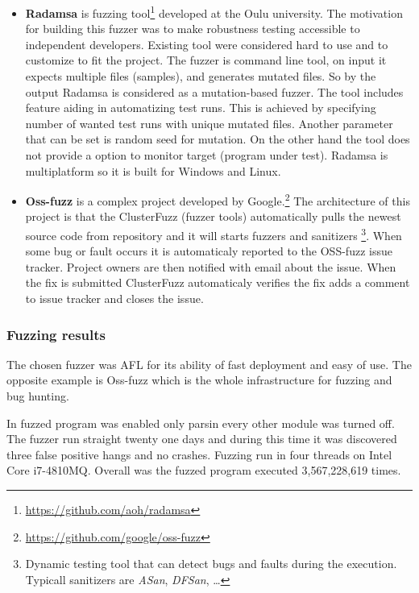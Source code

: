 \begin{itemize}
	\item \textbf{Radamsa} is fuzzing tool\footnote{\url{https://github.com/aoh/radamsa}} developed at the Oulu university.
	The motivation for building this fuzzer was to make robustness testing accessible to independent developers.
	Existing tool were considered hard to use and to customize to fit the project.
	The fuzzer is command line tool, on input it expects multiple files (samples), and generates mutated files.
	So by the output Radamsa is considered as a mutation-based fuzzer.
	The tool includes feature aiding in automatizing test runs.
	This is achieved by specifying number of wanted test runs with unique mutated files.
	Another parameter that can be set is random seed for mutation.
	On the other hand the tool does not provide a option to monitor target (program under test).
	Radamsa is multiplatform so it is built for Windows and Linux.\cite{radamsaThesis}

	\item \textbf{Oss-fuzz} is a complex project developed by Google.\footnote{\url{https://github.com/google/oss-fuzz}}
	The architecture of this project is that the ClusterFuzz (fuzzer tools)
	automatically pulls the newest source code from repository and it will starts
	fuzzers and sanitizers \footnote{Dynamic testing tool that can detect bugs and
	faults during the execution. Typicall sanitizers are \textit{ASan},
	\textit{DFSan}, \ldots}. When some bug or fault occurs it is automaticaly
	reported to the OSS-fuzz issue tracker. Project owners are then notified with
	email about the issue. When the fix is submitted ClusterFuzz automaticaly
	verifies the fix adds a comment to issue tracker and closes the issue.

\end{itemize}


\subsubsection{Fuzzing results}
The chosen fuzzer was AFL for its ability of fast deployment and easy of use.
The opposite example is Oss-fuzz which is the whole infrastructure for fuzzing and bug hunting.

In fuzzed program was enabled only parsin every other module was turned off.
The fuzzer run straight twenty one days and during this time it was discovered
three false positive hangs and no crashes. Fuzzing run in four threads on Intel
Core i7-4810MQ. Overall was the fuzzed program executed 3,567,228,619 times.

